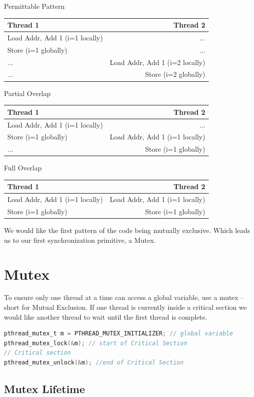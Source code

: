 Permittable Pattern
\begin{tabular}{ l | r }
  Thread 1 & Thread 2 \\ \hline
  Load Addr, Add 1 (i=1 locally) & ...  \\
  Store (i=1 globally) & ...  \\
  ... & Load Addr, Add 1 (i=2 locally)  \\
  ... & Store (i=2 globally)  \\
\end{tabular}

Partial Overlap
\begin{tabular}{ l | r }
Thread 1 & Thread 2 \\ \hline
Load Addr, Add 1 (i=1 locally) & ... \\
Store (i=1 globally) & Load Addr, Add 1 (i=1 locally) \\
... & Store (i=1 globally) \\
\end{tabular}

Full Overlap
\begin{tabular}{ l | r }
Thread 1 & Thread 2 \\ \hline
Load Addr, Add 1 (i=1 locally) & Load Addr, Add 1 (i=1 locally) \\
Store (i=1 globally) & Store (i=1 globally) \\
\end{tabular}

We would like the first pattern of the code being mutually exclusive.
Which leads us to our first synchronization primitive, a Mutex.

\section{Mutex}

To ensure only one thread at a time can access a global variable, use a mutex -- short for Mutual Exclusion.
If one thread is currently inside a critical section we would like another thread to wait until the first thread is complete.

\begin{lstlisting}[language=C]
pthread_mutex_t m = PTHREAD_MUTEX_INITIALIZER; // global variable
pthread_mutex_lock(&m); // start of Critical Section
// Critical section
pthread_mutex_unlock(&m); //end of Critical Section
\end{lstlisting}

\subsection{Mutex Lifetime}

